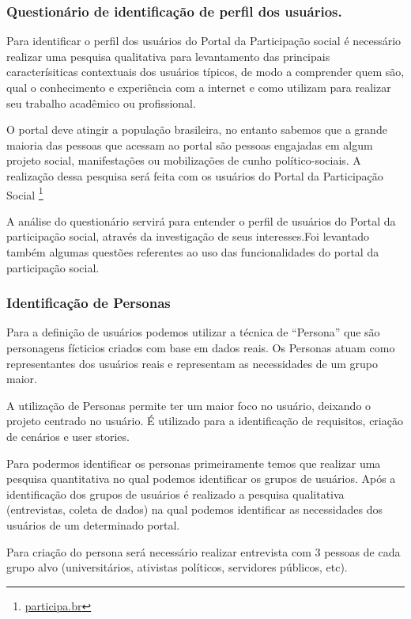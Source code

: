 \subsubsection{Questionário de identificação de perfil dos usuários.}

Para identificar o perfil dos usuários do Portal da Participação social é necessário realizar uma pesquisa qualitativa para levantamento das principais caracterísiticas contextuais dos usuários típicos, de modo a comprender quem são, qual o conhecimento e experiência com a internet e como utilizam para realizar seu trabalho acadêmico ou profissional. 

O portal deve atingir a população brasileira, no entanto sabemos que a grande maioria das pessoas que acessam ao portal são pessoas engajadas em algum projeto social, manifestações ou mobilizações de cunho político-sociais. A realização dessa pesquisa será feita com os usuários do Portal da Participação Social \footnote{\url{participa.br}}

A análise do questionário servirá para entender o perfil de usuários do Portal da participação social, através da investigação de seus interesses.Foi levantado também algumas questões referentes ao uso das funcionalidades do portal da participação social.


\subsubsection{Identificação de Personas}

	Para a definição de usuários podemos utilizar a técnica de “Persona” que são personagens fícticios criados com base em dados reais. Os Personas atuam como representantes dos usuários reais e representam as necessidades de um grupo maior. 

	A utilização de Personas permite ter um maior foco no usuário, deixando o projeto centrado no usuário. É utilizado para a identificação de requisitos, criação de cenários e user stories. 

	Para podermos identificar os personas primeiramente temos que realizar uma pesquisa quantitativa no qual podemos identificar os grupos de usuários. Após a identificação dos grupos de usuários é realizado a pesquisa qualitativa (entrevistas, coleta de dados) na qual podemos identificar as necessidades dos usuários de um determinado portal.

	Para criação do persona será necessário realizar entrevista com 3 pessoas de cada grupo alvo (universitários, ativistas políticos, servidores públicos, etc).

